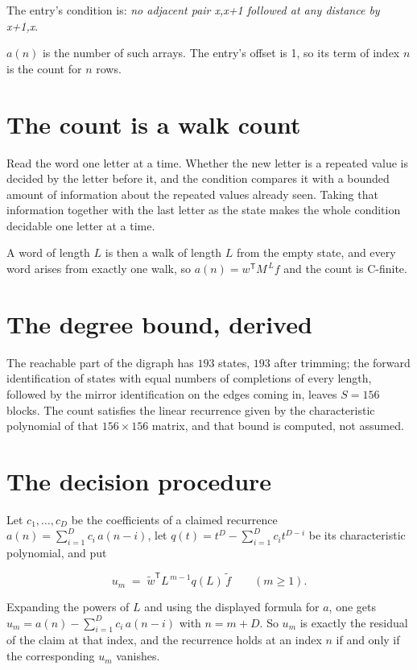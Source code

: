 \documentclass[11pt]{article}
\theoremstyle{definition}
\begin{document}
The entry's condition is: {\itshape no adjacent pair x,x+1 followed at any distance by x+1,x}.

$a(n)$ is the number of such arrays. The entry's offset is 1, so its term of index $n$ is the count for $n$ rows.

\section{The count is a walk count}

Read the word one letter at a time. Whether the new letter is a repeated value is decided by the letter before it, and the condition compares it with a bounded amount of information about the repeated values already seen. Taking that information together with the last letter as the state makes the whole condition decidable one letter at a time.

A word of length $L$ is then a walk of length $L$ from the empty state, and every word arises from exactly one walk, so $a(n) = w^{\mathsf T}M^{\,L}f$ and the count is C-finite.

\section{The degree bound, derived}

The reachable part of the digraph has $193$ states, $193$ after trimming; the forward identification of states with equal numbers of completions of every length, followed by the mirror identification on the edges coming in, leaves $S = 156$ blocks. The count satisfies the linear recurrence given by the characteristic polynomial of that $156\times156$ matrix, and that bound is computed, not assumed.

\section{The decision procedure}

Let $c_1,\dots,c_D$ be the coefficients of a claimed recurrence $a(n) = \sum_{i=1}^{D} c_i\,a(n-i)$, let $q(t) = t^{D} - \sum_{i=1}^{D} c_i t^{D-i}$ be its characteristic polynomial, and put

\[u_m \;=\; \tilde w^{\mathsf T} L^{\,m-1} q(L)\,\tilde f \qquad (m \ge 1).\]

Expanding the powers of $L$ and using the displayed formula for $a$, one gets $u_m = a(n) - \sum_{i=1}^{D} c_i\,a(n-i)$ with $n = m + D$. So $u_m$ is exactly the residual of the claim at that index, and the recurrence holds at an index $n$ if and only if the corresponding $u_m$ vanishes.
\end{document}
